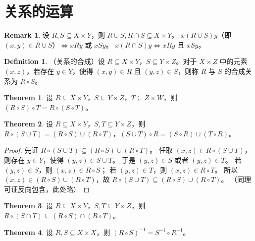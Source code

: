 \documentclass[oneside]{book}
\theoremstyle{definition}
\newtheorem{definition}{Definition}[section]
\newtheorem{theorem}{Theorem}[section]
\newtheorem{remark}{Remark}[section]
\begin{document}
		    \section{关系的运算}
		\begin{remark}
			设 \( R,S \subseteq X \times Y \)，则 \( R \cup S, R \cap S \subseteq X \times Y \)。
			\( x(R \cup S)y \)（即 \( (x,y) \in R \cup S \)）\( \iff xRy \) 或 \( xSy \)。
			\( x(R \cap S)y \iff xRy \) 且 \( xSy \)。
		\end{remark}
		
		\begin{definition}
			（关系的合成）设 \( R \subseteq X \times Y \)，\( S \subseteq Y \times Z \)。对于 \( X \times Z \) 中的元素 \( (x,z) \)，若存在 \( y \in Y \)，使得 \( (x,y) \in R \) 且 \( (y,z) \in S \)，则称 \( R \) 与 \( S \) 的合成关系为 \( R \circ S \)。
		\end{definition}
		
		\begin{theorem}
			设 \( R \subseteq X \times Y \)，\( S \subseteq Y \times Z \)，\( T \subseteq Z \times W \)，则 \( (R \circ S) \circ T = R \circ (S \circ T) \)。
		\end{theorem}
		
		\begin{theorem}
			设 \( R \subseteq X \times Y \)，\( S,T \subseteq Y \times Z \)，则 \( R \circ (S \cup T) = (R \circ S) \cup (R \circ T) \)，\( (S \cup T) \circ R = (S \circ R) \cup (T \circ R) \)。
		\end{theorem}
		\begin{proof}
			先证 \( R \circ (S \cup T) \subseteq (R \circ S) \cup (R \circ T) \)。
			任取 \( (x,z) \in R \circ (S \cup T) \)，则存在 \( y \in Y \)，使得 \( (y,z) \in S \cup T \)。
			于是 \( (y,z) \in S \) 或者 \( (y,z) \in T \)。
			若 \( (y,z) \in S \)，则 \( (x,z) \in R \circ S \)；
			若 \( (y,z) \in T \)，则 \( (x,z) \in R \circ T \)。
			所以 \( (x,z) \in (R \circ S) \cup (R \circ T) \)，故 \( R \circ (S \cup T) \subseteq (R \circ S) \cup (R \circ T) \)。
			（同理可证反向包含，此处略）
		\end{proof}
		
		\begin{theorem}
			设 \( R \subseteq X \times Y \)，\( S,T \subseteq Y \times Z \)，则 \( R \circ (S \cap T) \subseteq (R \circ S) \cap (R \circ T) \)。
		\end{theorem}
		
		\begin{theorem}
			设 \( R,S \subseteq X \times X \)，则 \( (R \circ S)^{-1} = S^{-1} \circ R^{-1} \)。
		\end{theorem}
		
\end{document}
